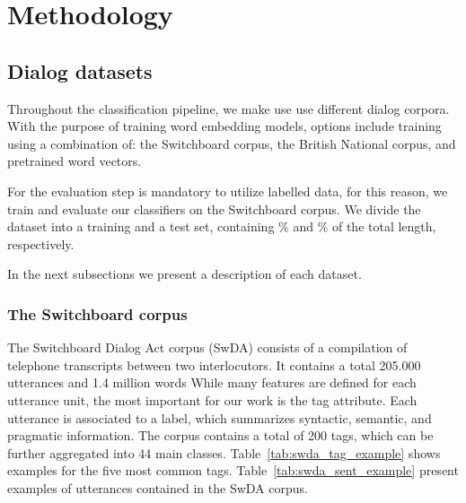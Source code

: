 \section{Methodology}\label{sec:method}
%


\subsection{Dialog datasets}
Throughout the classification pipeline, we make use use different dialog corpora. With the purpose of training word embedding models, options include training using a combination of: the Switchboard corpus, the British National corpus, and pretrained word vectors.

For the evaluation step is mandatory to utilize labelled data, for this reason, we train and evaluate our classifiers on the Switchboard corpus. We divide the dataset into a training and a test set, containing $\%$ and $\%$ of the total length, respectively. 

In the next subsections we present a description of each dataset.

\subsubsection*{The Switchboard corpus}
The Switchboard Dialog Act corpus (SwDA) consists of a compilation of telephone transcripts between two interlocutors. It contains a total 205.000 utterances and 1.4 million words
While many features are defined for each utterance unit, the most important for our work is the tag attribute. Each utterance is associated to a label, which summarizes syntactic, semantic, and pragmatic information. The corpus contains a total of 200 tags, which can be further aggregated into 44 main classes. Table~\ref{tab:swda_tag_example} shows examples for the five most common tags. Table~\ref{tab:swda_sent_example} present examples of utterances contained in the SwDA corpus.

